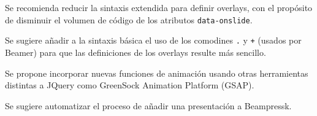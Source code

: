 \begin{recomendations}

	Se recomienda reducir la sintaxis extendida para definir overlays, con el propósito de disminuir el volumen de código de los atributos \texttt{data-onslide}.

	Se sugiere añadir a la sintaxis básica el uso de los comodines \texttt{.} y \texttt{+} (usados por Beamer) para que las definiciones de los overlays resulte más sencillo. 

	Se propone incorporar nuevas funciones de animación usando otras herramientas distintas a JQuery como GreenSock Animation Platform (GSAP). 

	Se sugiere automatizar el proceso de añadir una presentación a Beampressk.

	

\end{recomendations}
